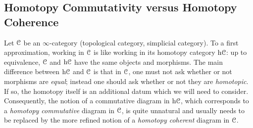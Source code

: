 \subsection{Homotopy Commutativity versus Homotopy Coherence}\label{comcoh}
\begin{1.2.6 Commutativity vs coherence}
Let $\operatorname{\mathcal{C}}$ be an $\infty$-category (topological category, simplicial category). 
To a first approximation,
working in $\operatorname{\mathcal{C}}$ is like working in its homotopy category $\rm{h} \it{
\operatorname{\mathcal{C}}}$: up to equivalence, $\operatorname{\mathcal{C}}$ and $\rm{h} \it{\operatorname{\mathcal{C}}}$ have the same
objects and morphisms. The main difference between $\rm{h} \it{\operatorname{\mathcal{C}}}$ and
$\operatorname{\mathcal{C}}$ is that in $\operatorname{\mathcal{C}}$, one must not ask whether or not
morphisms are {\em equal}; instead one should ask whether or not they are {\it homotopic}. If so, the homotopy itself is an additional datum which we will need to consider. Consequently, the notion of a commutative diagram in
$\rm{h} \it{\operatorname{\mathcal{C}}}$, which corresponds to a {\it homotopy commutative}
diagram in $\operatorname{\mathcal{C}}$, is quite unnatural and usually needs to be
replaced by the more refined notion of a {\it homotopy coherent}
diagram in $\operatorname{\mathcal{C}}$.


\end{1.2.6 Commutativity vs coherence}

